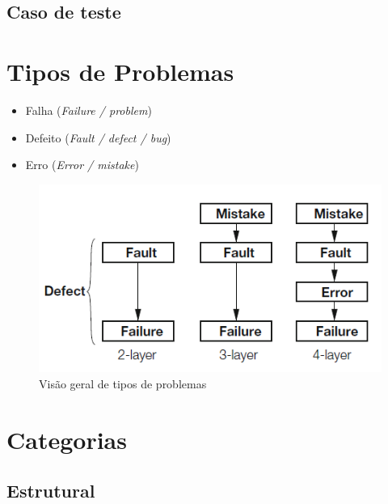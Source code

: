 \documentclass[
	12pt,				%
	openright,			%
	twoside,			%
	a4paper,			%
	english,			%
	brazil,				%
	]{abntex2}
\begin{document}
\subsection{Caso de teste}

\section{Tipos de Problemas}


\begin{itemize}
    \item Falha (\emph{Failure / problem})
    \item Defeito (\emph{Fault / defect / bug})
    \item Erro (\emph{Error / mistake})
\end{itemize}

\begin{figure}[h]
    \centering
    \graphicspath{ {./graphics/} }
    \includegraphics[scale=0.8]{defeito_falha_erro}
    \caption{Visão geral de tipos de problemas}
    \label{fig:tipos_problemas}
\end{figure}

\section{Categorias}


\subsection{Estrutural}
\end{document}
